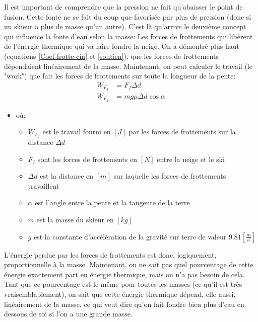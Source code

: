 \documentclass{article}
\begin{document}
Il est important de comprendre que la pression ne fait qu'abaisser le point de fusion. Cette fonte ne se fait du coup que favorisée par plus de pression (donc si un skieur a plus de masse qu'un autre). C'est là qu'arrive le deuxième concept qui influence la fonte d'eau selon la masse: Les forces de frottements qui libèrent de l'énergie thermique qui va faire fondre la neige. 
On a démontré plus haut (equations \ref{Coef-frotte-cin} et \ref{soutien}), que les forces de frottements dépendaient linéairement de la masse. Maintenant, on peut calculer le travail (le "work") que fait les forces de frottements sur toute la longueur de la pente:
\begin{align}
    \nonumber
    W_{F_f} &= F_f \Delta d \\
    \label{Work_forfro}
    W_{F_f} &= mg \mu \Delta d \cos{\alpha}
\end{align}
\begin{itemize}
    \item où:
    \begin{itemize}
        \item $W_{F_f}$ est le travail fourni en $[J]$ par les forces de frottements sur la distance $\Delta d$
        \item $F_f$ sont les forces de frottements en $[N]$ entre la neige et le ski
        \item $\Delta d$ est la distance en $[m]$ sur laquelle les forces de frottements travaillent
        \item $\alpha$ est l'angle entre la pente et la tangente de la terre
        \item $m$ est la masse du skieur en $[kg]$
        \item $g$ est la constante d'accélération de la gravité sur terre de valeur $9.81 [\frac{m}{s^2}]$
    \end{itemize}
\end{itemize}

L'énergie perdue par les forces de frottements est donc, logiquement, proportionnelle à la masse. Maintenant, on ne sait pas quel pourcentage de cette énergie exactement part en énergie thermique, mais on n'a pas besoin de cela. Tant que ce pourcentage est le même pour toutes les masses (ce qu'il est très vraisemblablement), on sait que cette énergie thermique dépend, elle aussi, linéairement de la masse, ce qui veut dire qu'on fait fondre bien plus d'eau en dessous de soi si l'on a une grande masse.

\vspace{0.2cm}
\end{document}
